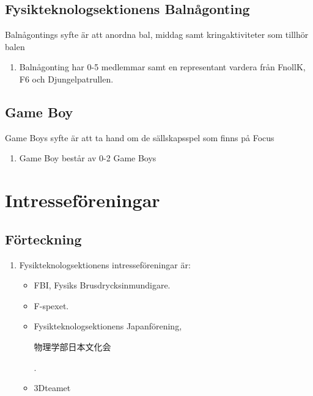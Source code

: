 \documentclass[11pt,a4paper]{article}
\begin{document}
\subsection{Fysikteknologsektionens Balnågonting}
Balnågontings syfte är att anordna bal, middag samt kringaktiviteter som tillhör balen
\begin{enumerate}[\thesubsection .1]

	\item Balnågonting har 0-5 medlemmar samt en representant vardera från FnollK, F6 och Djungelpatrullen.
  
\end{enumerate}

\subsection{Game Boy}
Game Boys syfte är att ta hand om de sällskapsspel som finns på Focus
\begin{enumerate}[\thesubsection .1]

	\item Game Boy består av 0-2 Game Boys
	
\end{enumerate}



\newpage


\section{Intresseföreningar}

\subsection{Förteckning}

\begin{enumerate}[\thesubsection .1]

  \item Fysikteknologsektionens intresseföreningar är:
    \begin{itemize}
    
    \item FBI, Fysiks Brusdrycksinmundigare.
    \item F-spexet.
    \item Fysikteknologsektionens Japanförening, \begin{CJK}{UTF8}{min}物理学部日本文化会\end{CJK} .
    \item 3Dteamet
    \end{itemize}
\end{enumerate}
\end{document}
